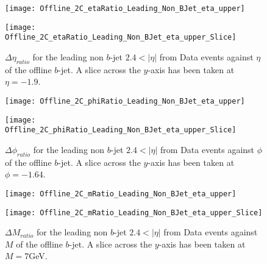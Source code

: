 		\begin{figure}[h]
			\centering
			
			\begin{minipage}[h]{0.33\linewidth}
				\texttt{[image: Offline\_2C\_etaRatio\_Leading\_Non\_BJet\_eta\_upper]}
			\end{minipage}
			\quad
			\begin{minipage}[h]{0.33\linewidth}
				\texttt{[image: Offline\_2C\_etaRatio\_Leading\_Non\_BJet\_eta\_upper\_Slice]}
			\end{minipage}
			\caption{$\Delta \eta_{ratio}$ for the leading \pt non $b$-jet $2.4 < |\eta|$ from Data events against $\eta$ of the offline $b$-jet. A slice across the $y$-axis has been taken at $\eta=-1.9$. }
			\label{fig:D:leadingnonbetaforward}
		\end{figure}
		
		\begin{figure}[h]
			\centering
			
			\begin{minipage}[h]{0.33\linewidth}
				\texttt{[image: Offline\_2C\_phiRatio\_Leading\_Non\_BJet\_eta\_upper]}
			\end{minipage}
			\quad
			\begin{minipage}[h]{0.33\linewidth}
				\texttt{[image: Offline\_2C\_phiRatio\_Leading\_Non\_BJet\_eta\_upper\_Slice]}
			\end{minipage}
			\caption{$\Delta \phi_{ratio}$ for the leading \pt non $b$-jet $2.4 < |\eta|$ from Data events against $\phi$ of the offline $b$-jet. A slice across the $y$-axis has been taken at $\phi=-1.64$. }
			\label{fig:D:leadingnonbphiforward}
		\end{figure}
		
		\begin{figure}[h]
			\centering
			
			\begin{minipage}[h]{0.33\linewidth}
				\texttt{[image: Offline\_2C\_mRatio\_Leading\_Non\_BJet\_eta\_upper]}
			\end{minipage}
			\quad
			\begin{minipage}[h]{0.33\linewidth}
				\texttt{[image: Offline\_2C\_mRatio\_Leading\_Non\_BJet\_eta\_upper\_Slice]}
			\end{minipage}
			\caption{$\Delta M_{ratio}$ for the leading \pt non $b$-jet $2.4 < |\eta|$ from Data events against $M$ of the offline $b$-jet. A slice across the $y$-axis has been taken at $M=7$GeV. }
			\label{fig:D:leadingnonbmforward}
		\end{figure}

